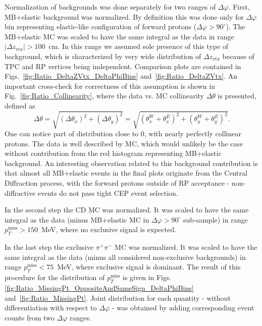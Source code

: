 Normalization of backgrounds was done separately for two ranges of $\Delta\varphi$. First, MB+elastic background was normalized. By definition this was done only for $\Delta\varphi$ bin representing elastic-like configuration of forward protons ($\Delta\varphi>90^{\circ}$). The MB+elastic MC was scaled to have the same integral as the data in range $|\Delta z_{\text{vtx}}|>100$~cm. In this range we assumed sole presence of this type of background, which is characterized by very wide distribution of $\Delta z_{\text{vtx}}$ because of TPC and RP vertices being independent. Comparison plots are contained in Figs.~\ref{fig:Ratio_DeltaZVtx_DeltaPhiBins} and~\ref{fig:Ratio_DeltaZVtx}. An important cross-check for correctness of this assumption is shown in Fig.~\ref{fig:Ratio_Collinearity}, where the data vs. MC collinearity $\Delta\theta$ is presented, defined as%
%
\begin{equation}\label{eq:collinearity}%
 \Delta\theta = \sqrt{\left(\Delta\theta_{x}\right)^{2} + \left(\Delta\theta_{y}\right)^{2}} = \sqrt{\left(\theta_{x}^{W}+\theta_{x}^{E}\right)^{2} + \left(\theta_{y}^{W}+\theta_{y}^{E}\right)^{2}}.
\end{equation}
%
One can notice part of distribution close to 0, with nearly perfectly collinear protons. The data is well described by MC, which would unlikely be the case without contribution from the red histogram representing MB+elastic background. An interesting observation related to this background contribution is that almost all MB+elastic events in the final plots originate from the Central Diffraction process, with the forward protons outside of RP acceptance - non-diffractive events do not pass tight CEP event selection.

In the second step the CD MC was normalized. It was scaled to have the same integral as the data (minus MB+elastic MC in $\Delta\varphi>90^{\circ}$ sub-sample) in range $p_{T}^{\text{miss}}>150$~MeV, where no exclusive signal is expected.

In the last step the exclusive $\pi^{+}\pi^{-}$ MC was normalized. It was scaled to have the same integral as the data (minus all considered non-exclusive backgrounds) in range $p_{T}^{\text{miss}}<75$~MeV, where exclusive signal is dominant. The result of this procedure for the distribution of $p_{T}^{\text{miss}}$ is given in Figs.\ref{fig:Ratio_MissingPt_OppositeAndSameSign_DeltaPhiBins} and~\ref{fig:Ratio_MissingPt}. Joint distribution for each quantity - without differentiation with respect to $\Delta\varphi$ - was obtained by adding corresponding event counts from two $\Delta\varphi$ ranges.

